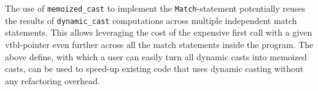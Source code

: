 \documentclass[preprint]{sigplanconf}
\makeatletter
\DeclareRobustCommand{\code}[1]{{\lstinline[breaklines=false,escapechar=@]{#1}}}
\makeatother
\begin{document}
The use of \code{memoized_cast} to implement the \code{Match}-statement potentially reuses the 
results of \code{dynamic_cast} computations across multiple independent match 
statements. This allows leveraging the cost of the expensive first call with a 
given vtbl-pointer even further across all the match statements inside the 
program. The above define, with which a user can easily turn all dynamic casts 
into memoized casts, can be used to speed-up existing code that uses dynamic 
casting without any refactoring overhead.



%
\end{document}
